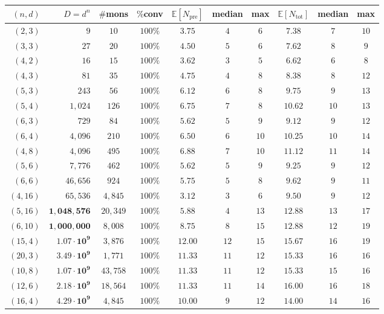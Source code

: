 \documentclass[11pt,a4paper]{article}
\begin{document}
\begin{center}
\begin{tabular}{rrcccccccc}
\toprule
$(n, d)$ & $D = d^n$ & $\#$mons & $\%$conv & $\mathbb{E}[N_{\text{pre}}]$ & median & max & $\mathbb{E}[N_{\text{tot}}]$ & median & max \\
\midrule
$(2, 3)$  & $9$         & $10$    & $100\%$ & $3.75$ & $4$  & $6$  & $7.38$  & $7$  & $10$ \\
$(3, 3)$  & $27$        & $20$    & $100\%$ & $4.50$ & $5$  & $6$  & $7.62$  & $8$  & $9$  \\
$(4, 2)$  & $16$        & $15$    & $100\%$ & $3.62$ & $3$  & $5$  & $6.62$  & $6$  & $8$  \\
$(4, 3)$  & $81$        & $35$    & $100\%$ & $4.75$ & $4$  & $8$  & $8.38$  & $8$  & $12$ \\
$(5, 3)$  & $243$       & $56$    & $100\%$ & $6.12$ & $6$  & $8$  & $9.75$  & $9$  & $13$ \\
$(5, 4)$  & $1{,}024$     & $126$   & $100\%$ & $6.75$ & $7$  & $8$  & $10.62$ & $10$ & $13$ \\
$(6, 3)$  & $729$       & $84$    & $100\%$ & $5.62$ & $5$  & $9$  & $9.12$  & $9$  & $12$ \\
$(6, 4)$  & $4{,}096$     & $210$   & $100\%$ & $6.50$ & $6$  & $10$ & $10.25$ & $10$ & $14$ \\
$(4, 8)$  & $4{,}096$     & $495$   & $100\%$ & $6.88$ & $7$  & $10$ & $11.12$ & $11$ & $14$ \\
$(5, 6)$  & $7{,}776$     & $462$   & $100\%$ & $5.62$ & $5$  & $9$  & $9.25$  & $9$  & $12$ \\
$(6, 6)$  & $46{,}656$    & $924$   & $100\%$ & $5.75$ & $5$  & $8$  & $9.62$  & $9$  & $11$ \\
$(4, 16)$ & $65{,}536$    & $4{,}845$ & $100\%$ & $\mathbf{3.12}$ & $3$  & $6$  & $9.50$  & $9$  & $12$ \\
$(5, 16)$ & $\mathbf{1{,}048{,}576}$ & $20{,}349$ & $100\%$ & $5.88$ & $4$  & $13$ & $12.88$ & $13$ & $17$ \\
$(6, 10)$ & $\mathbf{1{,}000{,}000}$ & $8{,}008$  & $100\%$ & $8.75$ & $8$  & $15$ & $12.88$ & $12$ & $19$ \\
$(15, 4)$ & $\mathbf{1.07 \cdot 10^{9}}$ & $3{,}876$ & $100\%$ & $12.00$ & $12$ & $15$ & $15.67$ & $16$ & $19$ \\
$(20, 3)$ & $\mathbf{3.49 \cdot 10^{9}}$ & $1{,}771$ & $100\%$ & $11.33$ & $11$ & $12$ & $15.33$ & $16$ & $16$ \\
$(10, 8)$ & $\mathbf{1.07 \cdot 10^{9}}$ & $43{,}758$ & $100\%$ & $11.33$ & $11$ & $12$ & $15.33$ & $15$ & $16$ \\
$(12, 6)$ & $\mathbf{2.18 \cdot 10^{9}}$ & $18{,}564$ & $100\%$ & $11.33$ & $11$ & $14$ & $16.00$ & $16$ & $18$ \\
$(16, 4)$ & $\mathbf{4.29 \cdot 10^{9}}$ & $4{,}845$ & $100\%$ & $10.00$ & $9$ & $12$ & $14.00$ & $14$ & $16$ \\
\bottomrule
\end{tabular}
\end{center}
\end{document}
